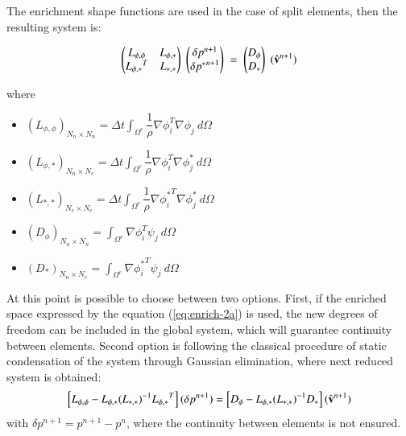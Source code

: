 The enrichment shape functions are used in the case of split elements, then the resulting system is:

  \begin{equation}
  \label{eqsys-poisson}
   \begin{pmatrix}
      L_{\phi,\phi} & L_{\phi,*}\\
      {L_{\phi,*}}^T & L_{*,*}
   \end{pmatrix}\;
    \begin{pmatrix}
      \delta p^{n+1}\\
      \delta {p^*}^{n+1}
   \end{pmatrix}\; = \;
   \begin{pmatrix}
      D_{\phi}\\
      D_*
   \end{pmatrix}\;
   (\hat{\mathbf{v}}^{n+1})
\end{equation}

where
\begin{itemize}
 \item ${(L_{\phi,\phi})}_{N_n\times N_n} = \Delta t \displaystyle \int_{\Omega^e} \dfrac{1}{\rho} \nabla \phi_i^T \nabla \phi_j \ d\Omega$
 \item ${(L_{\phi,*})}_{N_n\times N_e} = \Delta t \displaystyle \int_{\Omega^e} \dfrac{1}{\rho} \nabla \phi_i^T \nabla \phi_j^* \ d\Omega$
 \item ${(L_{*,*})}_{N_e\times N_e} = \Delta t \displaystyle \int_{\Omega^e} \dfrac{1}{\rho} \nabla {\phi_i^*}^T \nabla \phi_j^* \ d\Omega$
 \item ${(D_{\phi})}_{N_n\times N_n} = \displaystyle \int_{\Omega^e} \nabla \phi_i^T \psi_j \ d\Omega$
 \item ${(D_*)}_{N_n\times N_e} = \displaystyle \int_{\Omega^e}  \nabla {\phi_i^*}^T \psi_j \ d\Omega$
\end{itemize}

At this point is possible to choose between two options. First, if the enriched space expressed by the equation (\ref{eq:enrich-2a}) is used, the new degrees of freedom can be included in the global system, which will guarantee continuity between elements. Second option is following the classical procedure of static condensation of the system through Gaussian elimination\cite{Felippa04}, where next reduced system is obtained:
  \begin{equation}
   \left[L_{\phi,\phi} - L_{\phi,*}{(L_{*,*})}^{-1}{L_{\phi,*}}^T\right](\delta p^{n+1}) = \left[D_{\phi}- L_{\phi,*}{(L_{*,*})}^{-1}D_{*}\right](\hat{\mathbf{v}}^{n+1})
   \label{condensing}
  \end{equation}
with $\delta p^{n+1} = p^{n+1}-p^{n}$, where the continuity between elements is not ensured.

